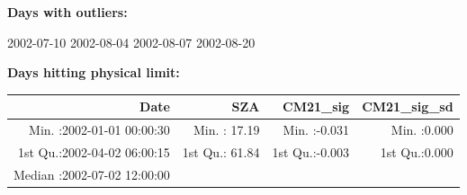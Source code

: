 \documentclass[
  10pt,
  a4paper,oneside]{article}
\begin{document}
\normalsize

\textbf{Days with outliers:}

2002-07-10 2002-08-04 2002-08-07 2002-08-20

\textbf{Days hitting physical limit:}

\footnotesize

\begin{longtable}[]{@{}rrrr@{}}
\toprule
\begin{minipage}[b]{0.33\columnwidth}\raggedleft
Date\strut
\end{minipage} & \begin{minipage}[b]{0.19\columnwidth}\raggedleft
SZA\strut
\end{minipage} & \begin{minipage}[b]{0.19\columnwidth}\raggedleft
CM21\_sig\strut
\end{minipage} & \begin{minipage}[b]{0.19\columnwidth}\raggedleft
CM21\_sig\_sd\strut
\end{minipage}\tabularnewline
\midrule
\endhead
\begin{minipage}[t]{0.33\columnwidth}\raggedleft
Min. :2002-01-01 00:00:30\strut
\end{minipage} & \begin{minipage}[t]{0.19\columnwidth}\raggedleft
Min. : 17.19\strut
\end{minipage} & \begin{minipage}[t]{0.19\columnwidth}\raggedleft
Min. :-0.031\strut
\end{minipage} & \begin{minipage}[t]{0.19\columnwidth}\raggedleft
Min. :0.000\strut
\end{minipage}\tabularnewline
\begin{minipage}[t]{0.33\columnwidth}\raggedleft
1st Qu.:2002-04-02 06:00:15\strut
\end{minipage} & \begin{minipage}[t]{0.19\columnwidth}\raggedleft
1st Qu.: 61.84\strut
\end{minipage} & \begin{minipage}[t]{0.19\columnwidth}\raggedleft
1st Qu.:-0.003\strut
\end{minipage} & \begin{minipage}[t]{0.19\columnwidth}\raggedleft
1st Qu.:0.000\strut
\end{minipage}\tabularnewline
\begin{minipage}[t]{0.33\columnwidth}\raggedleft
Median :2002-07-02 12:00:00\strut
\end{minipage} & \begin{minipage}[t]{0.19\columnwidth}\raggedleft

\end{minipage}
\end{longtable}
\end{document}
